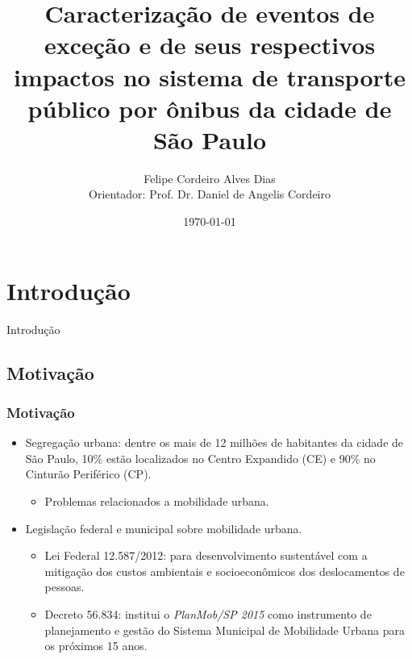 \documentclass{beamer}
\title[Exame de Qualificação]{Caracterização de eventos de exceção e de seus respectivos impactos no sistema de transporte público por ônibus da cidade de São Paulo} %
\author[DIAS, F.; CORDEIRO, D.]{Felipe Cordeiro Alves Dias\\[1mm]Orientador: Prof. Dr. Daniel de Angelis Cordeiro}
\institute[USP-EACH] %
{
Universidade de São Paulo \\ %
\medskip
}
\date{\today} %
\begin{document}
\begin{frame}
\titlepage %
\end{frame}

\section{Introdução}
\begin{frame}
\Huge{\centerline{Introdução}}
\end{frame}
\subsection{Motivação}
\begin{frame}
\frametitle{Motivação}
\begin{itemize}
\item Segregação urbana: dentre os mais de 12 milhões de habitantes da cidade de São Paulo, 10\% estão localizados no Centro Expandido (CE) e 90\% no Cinturão Periférico (CP).
\begin{itemize}
\item Problemas relacionados a mobilidade urbana.
\end{itemize}
\end{itemize}

\begin{itemize}
\item Legislação federal e municipal sobre mobilidade urbana.
\begin{itemize}
\item Lei Federal 12.587/2012: para desenvolvimento sustentável com a mitigação dos custos ambientais e socioeconômicos dos deslocamentos de pessoas.
\item Decreto 56.834: institui o \textit{PlanMob/SP 2015} como instrumento de planejamento e gestão do Sistema Municipal de Mobilidade Urbana para os próximos 15 anos.
\end{itemize}
\end{itemize}

\end{frame}
\end{document}
